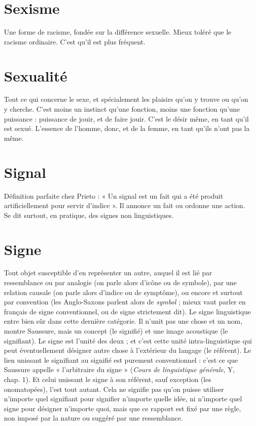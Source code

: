 \section{Sexisme}
Une forme de racisme, fondée sur la différence sexuelle. Mieux
toléré que le racisme ordinaire. C’est qu’il est plus fréquent.

\section{Sexualité}
Tout ce qui concerne le sexe, et spécialement les plaisirs qu’on
y trouve ou qu'on y cherche. C’est moins un instinct qu’une
fonction, moins une fonction qu’une puissance : puissance de jouir, et de faire
jouir. C’est le désir même, en tant qu’il est sexué. L’essence de l’homme, donc,
et de la femme, en tant qu’ils n’ont pas la même.

\section{Signal}
Définition parfaite chez Prieto : « Un signal est un fait qui a été
produit artificiellement pour servir d'indice ». Il annonce un fait
ou ordonne une action. Se dit surtout, en pratique, des signes non linguistiques.

\section{Signe}
Tout objet susceptible d’en représenter un autre, auquel il est lié par
ressemblance ou par analogie (on parle alors d’icône ou de symbole),
par une relation causale (on parle alors d’indice ou de symptôme), ou encore et
surtout par convention (les Anglo-Saxons parlent alors de {\it symbol} ; mieux vaut
parler en français de signe conventionnel, ou de signe strictement dit). Le signe
linguistique entre bien sûr dans cette dernière catégorie. Il n’unit pas une chose
et un nom, montre Saussure, mais un concept (le signifié) et une image acoustique
(le signifiant). Le signe est l’unité des deux ; et c’est cette unité intra-linguistique
qui peut éventuellement désigner autre chose à l'extérieur du langage
(le référent). Le lien unissant le signifiant au signifié est purement
conventionnel : c’est ce que Saussure appelle « l'arbitraire du signe » ({\it Cours de
linguistique générale}, Y, chap. 1). Et celui unissant le signe à son référent, sauf
exception (les onomatopées), l’est tout autant. Cela ne signifie pas qu’on puisse
utiliser n'importe quel signifiant pour signifier n'importe quelle idée, ni
n'importe quel signe pour désigner n’importe quoi, mais que ce rapport est fixé
par une règle, non imposé par la nature ou suggéré par une ressemblance.

